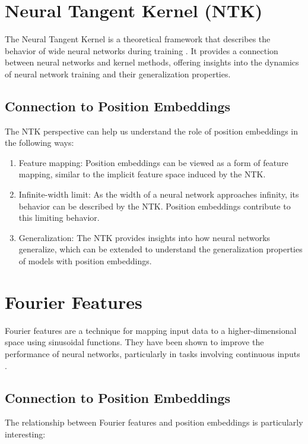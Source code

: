 \documentclass{article}
\begin{document}
\section{Neural Tangent Kernel (NTK)}

The Neural Tangent Kernel is a theoretical framework that describes the behavior of wide neural networks during training \citep{Jacot2018}. It provides a connection between neural networks and kernel methods, offering insights into the dynamics of neural network training and their generalization properties.

\subsection{Connection to Position Embeddings}

The NTK perspective can help us understand the role of position embeddings in the following ways:

\begin{enumerate}
    \item Feature mapping: Position embeddings can be viewed as a form of feature mapping, similar to the implicit feature space induced by the NTK.
    \item Infinite-width limit: As the width of a neural network approaches infinity, its behavior can be described by the NTK. Position embeddings contribute to this limiting behavior.
    \item Generalization: The NTK provides insights into how neural networks generalize, which can be extended to understand the generalization properties of models with position embeddings.
\end{enumerate}

\section{Fourier Features}

Fourier features are a technique for mapping input data to a higher-dimensional space using sinusoidal functions. They have been shown to improve the performance of neural networks, particularly in tasks involving continuous inputs \citep{Tancik2020}.

\subsection{Connection to Position Embeddings}

The relationship between Fourier features and position embeddings is particularly interesting:
\end{document}
